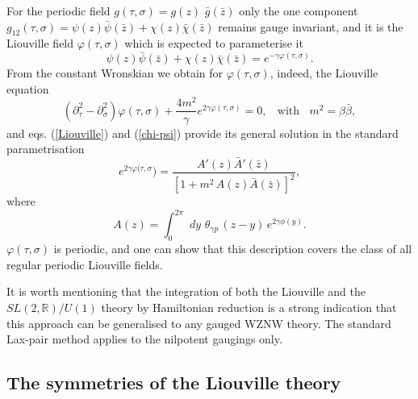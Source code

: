 \documentclass[a4paper,12pt]{article}
\newcommand{\rr}{\mathbb{R}}
\begin{document}
\noindent
For the periodic field ${g}(\tau ,\sigma)=g(z) \,\, \bar g(\bar
z)$ only the one component ${g}_{12}(\tau
,\sigma)=\psi(z)\bar\psi(\bar z)+\chi(z)\bar\chi(\bar z)$ remains
gauge invariant, and it is the Liouville field $\varphi(\tau, \sigma)$
which is expected to parameterise it
\begin{equation}\label{Liouville}
\psi(z)\bar\psi(\bar z)+\chi(z)\bar\chi(\bar z)=
e^{-\gamma \varphi(\tau, \sigma)}.
\end{equation}
From the constant Wronskian we obtain for
$\varphi(\tau, \sigma)$, indeed, the Liouville equation
\begin{equation}\label{Liouville-equation}
\left(\partial^2_\tau -\partial^2_\sigma\right)\varphi(\tau, \sigma)
+\frac{4m^2}{\gamma} e^{2\gamma\varphi(\tau, \sigma)}=0,~~~~\mbox{with}~~~~
m^2 =\beta\bar\beta,
\end{equation}
and eqs. (\ref{Liouville}) and (\ref{chi-psi}) provide its
general solution in the standard parametrisation
\begin{equation}\label{Liouville-sol}
e^{2\gamma\varphi(\tau, \sigma})=
\frac{A'(z)\bar A'(\bar z)}{[1+m^2\,A(z)\bar A(\bar z)]^2},
\end{equation}
where
\begin{equation}\label{A(z)}
A(z)=\int_0^{2\pi}\,\,
dy\,\,\theta_{\gamma p}\, (z-y)\,e^{2\gamma\phi(y)}.
\end{equation}
$\varphi(\tau,\sigma)$ is periodic, and one can show that this
description covers the class of all regular periodic Liouville fields.

\noindent
It is worth mentioning that the integration of
both the Liouville and the $SL(2,\rr)/U(1)$ theory \cite{FJW} by
Hamiltonian reduction is a strong indication that this approach can be
generalised to any gauged WZNW theory.
The standard Lax-pair method \cite{LS}
applies to the nilpotent gaugings only.



\subsection{The symmetries of the Liouville theory}
\end{document}
